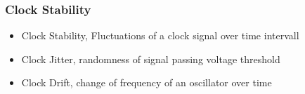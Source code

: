 \subsubsection{Clock Stability}
\begin{itemize}
	\item Clock Stability, Fluctuations of a clock signal over time intervall
	\item Clock Jitter, randomness of signal passing voltage threshold
	\item Clock Drift, change of frequency of an oscillator over time
\end{itemize}
\clearpage
\pagebreak